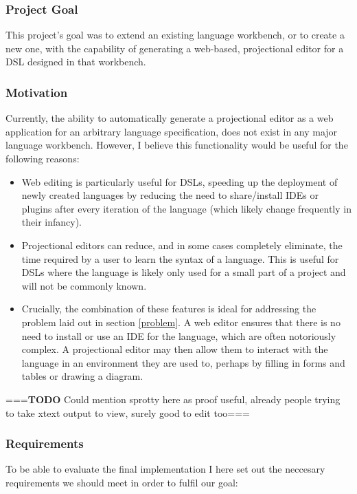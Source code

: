 \documentclass{article}
\begin{document}
\subsubsection{Project Goal}
This project's goal was to extend an existing language workbench, or to create a new one, with the capability of generating a web-based, projectional editor for a DSL designed in that workbench. 

\subsubsection{Motivation}
Currently, the ability to automatically generate a projectional editor as a web application for an arbitrary language specification, does not exist in any major language workbench. However, I believe this functionality would be useful for the following reasons:
\begin{itemize}
\item Web editing is particularly useful for DSLs, speeding up the deployment of newly created languages by reducing the need to share/install IDEs or plugins after every iteration of the language (which likely change frequently in their infancy). 
\item Projectional editors can reduce, and in some cases completely eliminate, the time required by a user to learn the syntax of a language. This is useful for DSLs where the language is likely only used for a small part of a project and will not be commonly known.
\item Crucially, the combination of these features is ideal for addressing the problem laid out in section \ref{problem}. A web editor ensures that there is no need to install or use an IDE for the language, which are often notoriously complex. A projectional editor may then allow them to interact with the language in an environment they are used to, perhaps by filling in forms and tables or drawing a diagram.  

\end{itemize} 

===\textbf{TODO} Could mention sprotty here as proof useful, already people trying to take xtext output to view, surely good to edit too===

\subsubsection{Requirements}\label{requirements}
To be able to evaluate the final implementation I here set out the neccesary requirements we should meet in order to fulfil our goal: 
\end{document}
